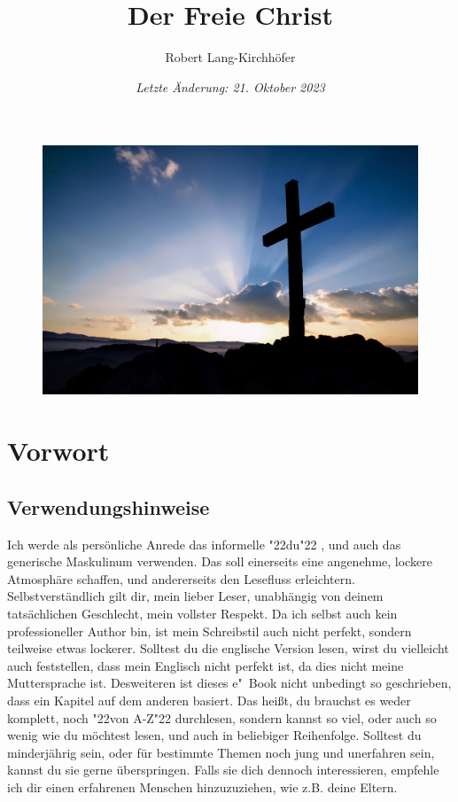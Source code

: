 \documentclass[10pt,a5paper]{article}
\title{\textbf{Der Freie Christ}}
\author{Robert Lang-Kirchh\"ofer}
\date{\textit{Letzte \"Anderung: 21. Oktober 2023}}
\newcommand{\q}[1]{\char"22{#1}\char"22 }
\begin{document}
	\setlength{\parindent}{0mm}
	\maketitle
	\begin{figure}[h]
		\centering
		\includegraphics[width=1\textwidth,keepaspectratio]{"FreeChristian.jpeg"}
	\end{figure}

	\newpage
	\pagecolor{white}
	\tableofcontents
	
	\newpage
	\section{Vorwort}

	\subsection{Verwendungshinweise}
		Ich werde als pers\"onliche Anrede das informelle \q{du},
		und auch das generische Maskulinum verwenden.
		Das soll einerseits eine angenehme,
		lockere Atmosph\"are schaffen,
		und andererseits den Lesefluss erleichtern.
		Selbstverst\"andlich gilt dir,
		mein lieber Leser,
		unabh\"angig von deinem tats\"achlichen Geschlecht,
		mein vollster Respekt.
		Da ich selbst auch kein professioneller Author bin,
		ist mein Schreibstil auch nicht perfekt,
		sondern teilweise etwas lockerer.
		Solltest du die englische Version lesen,
		wirst du vielleicht auch feststellen,
		dass mein Englisch nicht perfekt ist,
		da dies nicht meine Muttersprache ist.
		Desweiteren ist dieses e"~Book nicht unbedingt so geschrieben,
		dass ein Kapitel auf dem anderen basiert.
		Das hei{\ss}t,
		du brauchst es weder komplett,
		noch \q{von A-Z} durchlesen,
		sondern kannst so viel,
		oder auch so wenig wie du m\"ochtest lesen,
		und auch in beliebiger Reihenfolge.
		Solltest du minderj\"ahrig sein,
		oder f\"ur bestimmte Themen noch jung und unerfahren sein,
		kannst du sie gerne \"uberspringen.
		Falls sie dich dennoch interessieren,
		empfehle ich dir einen erfahrenen Menschen hinzuzuziehen,
		wie z.B. deine Eltern.
\end{document}
